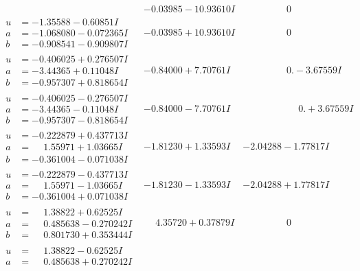 \documentclass[1p]{elsarticle_modified}
\theoremstyle{definition}
\begin{document}
$$\begin{array}{c|c|c}
 & -0.03985 - 10.93610 I & \phantom{-0.000000 } 0 \\ \hline\begin{aligned}
u &= -1.35588 - 0.60851 I \\
a &= -1.068080 - 0.072365 I \\
b &= -0.908541 - 0.909807 I\end{aligned}
 & -0.03985 + 10.93610 I & \phantom{-0.000000 } 0 \\ \hline\begin{aligned}
u &= -0.406025 + 0.276507 I \\
a &= -3.44365 + 0.11048 I \\
b &= -0.957307 + 0.818654 I\end{aligned}
 & -0.84000 + 7.70761 I & \phantom{-0.000000 } 0. - 3.67559 I \\ \hline\begin{aligned}
u &= -0.406025 - 0.276507 I \\
a &= -3.44365 - 0.11048 I \\
b &= -0.957307 - 0.818654 I\end{aligned}
 & -0.84000 - 7.70761 I & \phantom{-0.000000 -}0. + 3.67559 I \\ \hline\begin{aligned}
u &= -0.222879 + 0.437713 I \\
a &= \phantom{-}1.55971 + 1.03665 I \\
b &= -0.361004 - 0.071038 I\end{aligned}
 & -1.81230 + 1.33593 I & -2.04288 - 1.77817 I \\ \hline\begin{aligned}
u &= -0.222879 - 0.437713 I \\
a &= \phantom{-}1.55971 - 1.03665 I \\
b &= -0.361004 + 0.071038 I\end{aligned}
 & -1.81230 - 1.33593 I & -2.04288 + 1.77817 I \\ \hline\begin{aligned}
u &= \phantom{-}1.38822 + 0.62525 I \\
a &= \phantom{-}0.485638 - 0.270242 I \\
b &= \phantom{-}0.801730 + 0.353444 I\end{aligned}
 & \phantom{-}4.35720 + 0.37879 I & \phantom{-0.000000 } 0 \\ \hline\begin{aligned}
u &= \phantom{-}1.38822 - 0.62525 I \\
a &= \phantom{-}0.485638 + 0.270242 I \\

\end{aligned}
\end{array}$$
\end{document}
